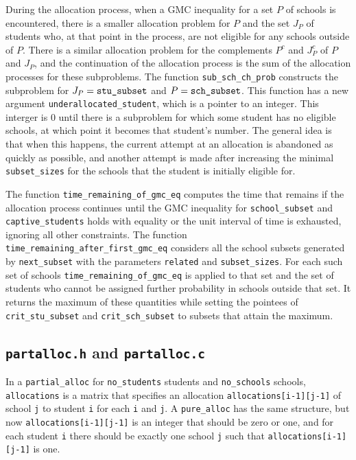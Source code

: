 \documentclass[12pt]{article}
\theoremstyle{definition}
\begin{document}
\begin{appendix}
During the allocation process, when a GMC inequality for a set $P$ of
schools is encountered, there is a smaller allocation problem for $P$
and the set $J_P$ of students who, at that point in the process, are
not eligible for any schools outside of $P$.  There is a similar
allocation problem for the complements $P^c$ and $J_P^c$ of $P$ and
$J_P$, and the continuation of the allocation process is the sum of
the allocation processes for these subproblems.  The function
\texttt{sub\_sch\_ch\_prob} constructs the subproblem for $J_P =
\text{\texttt{stu\_subset}}$ and $P = \text{\texttt{sch\_subset}}$.
This function has a new argument \texttt{underallocated\_student},
which is a pointer to an integer.  This interger is $0$ until there is
a subproblem for which some student has no eligible schools, at which
point it becomes that student's number.  The general idea is that when
this happens, the current attempt at an allocation is abandoned as
quickly as possible, and another attempt is made after increasing the
minimal \texttt{subset\_sizes} for the schools that the student is
initially eligible for.

The function \texttt{time\_remaining\_of\_gmc\_eq} computes the time
that remains if the allocation process continues until the GMC
inequality for \texttt{school\_subset} and \texttt{captive\_students}
holds with equality or the unit interval of time is exhausted,
ignoring all other constraints.  The function
\texttt{time\_remaining\_after\_first\_gmc\_eq} considers all the
school subsets generated by \texttt{next\_subset} with the parameters
\texttt{related} and \texttt{subset\_sizes}.  For each such set of
schools \texttt{time\_remaining\_of\_gmc\_eq} is applied to that set
and the set of students who cannot be assigned further probability in
schools outside that set.  It returns the maximum of these quantities
while setting the pointees of \texttt{crit\_stu\_subset} and
\texttt{crit\_sch\_subset} to subsets that attain the maximum.

\subsection{\texttt{partalloc.h} and \texttt{partalloc.c}}

In a \texttt{partial\_alloc} for \texttt{no\_students} students and
\texttt{no\_schools} schools, \texttt{allocations} is a matrix that
specifies an allocation \texttt{allocations[i-1][j-1]} of school
\texttt{j} to student \texttt{i} for each \texttt{i} and \texttt{j}.
A \texttt{pure\_alloc} has the same structure, but now
\texttt{allocations[i-1][j-1]} is an integer that should be zero or
one, and for each student \texttt{i} there should be exactly one
school \texttt{j} such that \texttt{allocations[i-1][j-1]} is one.


\end{appendix}
\end{document}
